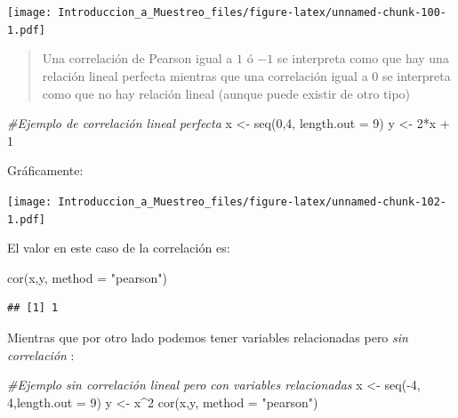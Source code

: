 \documentclass[
]{book}
\newenvironment{Shaded}{\begin{snugshade}}{\end{snugshade}}
\newcommand{\AttributeTok}[1]{\textcolor[rgb]{0.77,0.63,0.00}{#1}}
\newcommand{\CommentTok}[1]{\textcolor[rgb]{0.56,0.35,0.01}{\textit{#1}}}
\newcommand{\DecValTok}[1]{\textcolor[rgb]{0.00,0.00,0.81}{#1}}
\newcommand{\FunctionTok}[1]{\textcolor[rgb]{0.00,0.00,0.00}{#1}}
\newcommand{\NormalTok}[1]{#1}
\newcommand{\OtherTok}[1]{\textcolor[rgb]{0.56,0.35,0.01}{#1}}
\newcommand{\SpecialCharTok}[1]{\textcolor[rgb]{0.00,0.00,0.00}{#1}}
\newcommand{\StringTok}[1]{\textcolor[rgb]{0.31,0.60,0.02}{#1}}
\begin{document}
\texttt{[image: Introduccion\_a\_Muestreo\_files/figure-latex/unnamed-chunk-100-1.pdf]}

\begin{quote}
Una correlación de Pearson igual a \(1\) ó \(-1\) se interpreta como que hay una relación lineal perfecta mientras que una correlación igual a \(0\) se interpreta como que no hay relación lineal (aunque puede existir de otro tipo)
\end{quote}

\begin{Shaded}
\begin{Highlighting}[]
\CommentTok{\#Ejemplo de correlación lineal perfecta}
\NormalTok{x }\OtherTok{\textless{}{-}} \FunctionTok{seq}\NormalTok{(}\DecValTok{0}\NormalTok{,}\DecValTok{4}\NormalTok{, }\AttributeTok{length.out =} \DecValTok{9}\NormalTok{)}
\NormalTok{y }\OtherTok{\textless{}{-}} \DecValTok{2}\SpecialCharTok{*}\NormalTok{x }\SpecialCharTok{+} \DecValTok{1}
\end{Highlighting}
\end{Shaded}

Gráficamente:

\texttt{[image: Introduccion\_a\_Muestreo\_files/figure-latex/unnamed-chunk-102-1.pdf]}

El valor en este caso de la correlación es:

\begin{Shaded}
\begin{Highlighting}[]
\FunctionTok{cor}\NormalTok{(x,y, }\AttributeTok{method =} \StringTok{"pearson"}\NormalTok{)}
\end{Highlighting}
\end{Shaded}

\begin{verbatim}
## [1] 1
\end{verbatim}

Mientras que por otro lado podemos tener variables relacionadas pero \emph{sin correlación} :

\begin{Shaded}
\begin{Highlighting}[]
\CommentTok{\#Ejemplo sin correlación lineal pero con variables relacionadas}
\NormalTok{x }\OtherTok{\textless{}{-}} \FunctionTok{seq}\NormalTok{(}\SpecialCharTok{{-}}\DecValTok{4}\NormalTok{, }\DecValTok{4}\NormalTok{,}\AttributeTok{length.out =} \DecValTok{9}\NormalTok{)}
\NormalTok{y }\OtherTok{\textless{}{-}}\NormalTok{ x}\SpecialCharTok{\^{}}\DecValTok{2}
\FunctionTok{cor}\NormalTok{(x,y, }\AttributeTok{method =} \StringTok{"pearson"}\NormalTok{)}
\end{Highlighting}
\end{Shaded}
\end{document}
